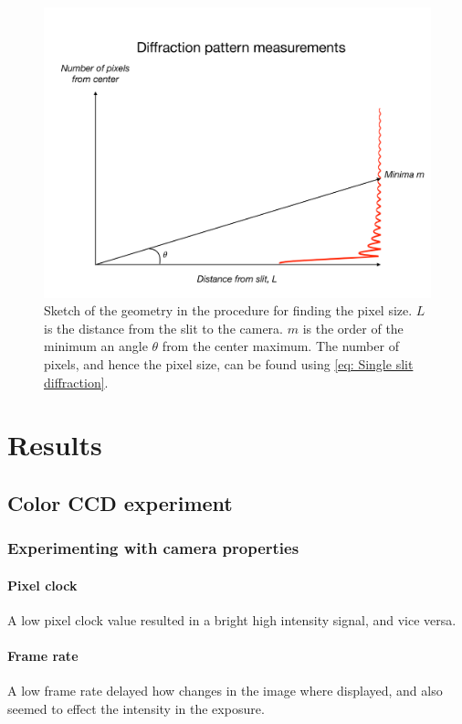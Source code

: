 \documentclass{emulateapj}
\begin{document}
\begin{figure}
	\centering
	\includegraphics[width=\linewidth]{./keynotes/pixelwidthmeasurments.pdf}
	\caption[Measurements diffraction pattern]{Sketch of the geometry in the procedure for finding the pixel size. $L$ is the distance from the slit to the camera. $m$ is the order of the minimum an angle $\theta$ from the center maximum. The number of pixels, and hence the pixel size, can be found using \cref{eq: Single slit diffraction}.}
	\label{fig: Diffraction measurements}
\end{figure}

\section{Results}
\label{sec:results}
\subsection{Color CCD experiment}
\label{subsec: Result/ color exp}
\subsubsection{Experimenting with camera properties}
\paragraph{Pixel clock}
A low pixel clock value resulted in a bright high intensity signal, and vice versa.
\paragraph{Frame rate}
A low frame rate delayed how changes in the image where displayed, and also seemed to effect the intensity in the exposure.
\end{document}
